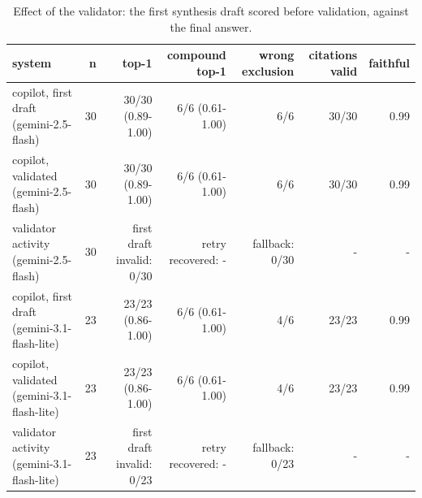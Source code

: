 \begin{table}[t]
\centering\small
\caption{Effect of the validator: the first synthesis draft scored before validation, against the final answer.}\label{tab:rq2_validator}
\begin{tabular}{lrrrrrr}
\toprule
system & n & top-1 & compound top-1 & wrong exclusion & citations valid & faithful \\
\midrule
copilot, first draft (gemini-2.5-flash) & 30 & 30/30 (0.89-1.00) & 6/6 (0.61-1.00) & 6/6 & 30/30 & 0.99 \\
copilot, validated (gemini-2.5-flash) & 30 & 30/30 (0.89-1.00) & 6/6 (0.61-1.00) & 6/6 & 30/30 & 0.99 \\
validator activity (gemini-2.5-flash) & 30 & first draft invalid: 0/30 & retry recovered: - & fallback: 0/30 & - & - \\
copilot, first draft (gemini-3.1-flash-lite) & 23 & 23/23 (0.86-1.00) & 6/6 (0.61-1.00) & 4/6 & 23/23 & 0.99 \\
copilot, validated (gemini-3.1-flash-lite) & 23 & 23/23 (0.86-1.00) & 6/6 (0.61-1.00) & 4/6 & 23/23 & 0.99 \\
validator activity (gemini-3.1-flash-lite) & 23 & first draft invalid: 0/23 & retry recovered: - & fallback: 0/23 & - & - \\
\bottomrule
\end{tabular}
\end{table}
